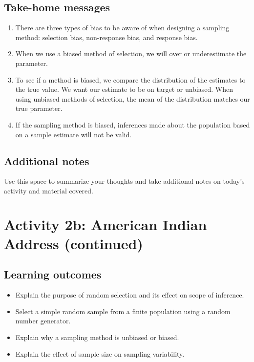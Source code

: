 \documentclass[
]{report}
\begin{document}
\hypertarget{take-home-messages-1}{%
\subsection{Take-home messages}\label{take-home-messages-1}}

\begin{enumerate}
\def\labelenumi{\arabic{enumi}.}
\item
  There are three types of bias to be aware of when designing a sampling method: selection bias, non-response bias, and response bias.
\item
  When we use a biased method of selection, we will over or underestimate the parameter.
\item
  To see if a method is biased, we compare the distribution of the estimates to the true value. We want our estimate to be on target or unbiased. When using unbiased methods of selection, the mean of the distribution matches our true parameter.
\item
  If the sampling method is biased, inferences made about the population based on a sample estimate will not be valid.
\end{enumerate}

\hypertarget{additional-notes-1}{%
\subsection{Additional notes}\label{additional-notes-1}}

Use this space to summarize your thoughts and take additional notes on today's activity and material covered.

\newpage

\hypertarget{activity-2b-american-indian-address-continued}{%
\section{Activity 2b: American Indian Address (continued)}\label{activity-2b-american-indian-address-continued}}


\hypertarget{learning-outcomes-2}{%
\subsection{Learning outcomes}\label{learning-outcomes-2}}

\begin{itemize}
\item
  Explain the purpose of random selection and its effect on scope of inference.
\item
  Select a simple random sample from a finite population using a random number generator.
\item
  Explain why a sampling method is unbiased or biased.
\item
  Explain the effect of sample size on sampling variability.
\end{itemize}
\end{document}
